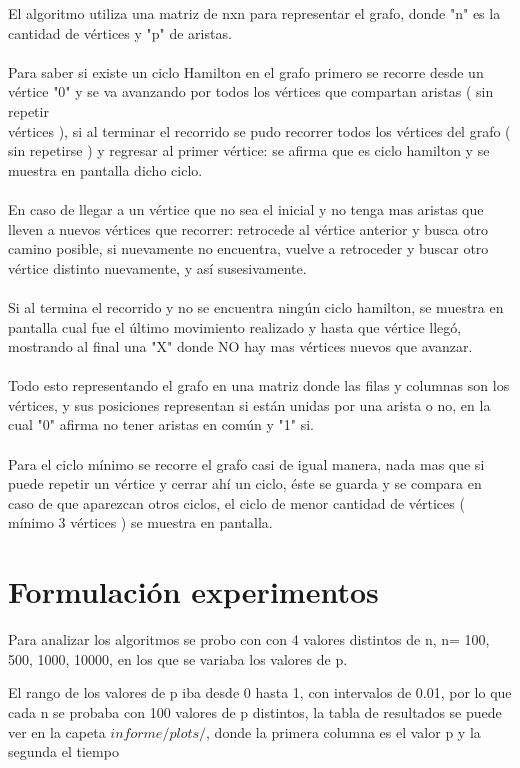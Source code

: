 \documentclass[12pt,letterpaper]{scrartcl}
\begin{document}
El algoritmo utiliza una matriz de nxn para representar el grafo, donde "n" es la cantidad de vértices y "p" de aristas.
\\\\
Para saber si existe un ciclo Hamilton en el grafo primero se recorre desde un vértice "0" y se va avanzando por todos los vértices que compartan aristas ( sin repetir \\vértices ), si al terminar el recorrido se pudo recorrer todos los vértices del grafo ( sin repetirse ) y regresar al primer vértice: se afirma que es ciclo hamilton y se muestra en pantalla dicho ciclo. 
\\\\
En caso de llegar a un vértice que no sea el inicial y no tenga mas aristas que lleven a nuevos vértices  que recorrer: retrocede al vértice anterior y busca otro camino posible, si nuevamente no encuentra, vuelve a retroceder y buscar otro vértice distinto nuevamente, y así susesivamente.
\\\\
Si al termina el recorrido y no se encuentra ningún ciclo hamilton, se muestra en pantalla cual fue el último movimiento realizado y hasta que vértice llegó, mostrando al final una "X" donde NO hay mas vértices nuevos que avanzar.
\\\\
Todo esto representando el grafo en una matriz donde las filas y columnas son los vértices, y sus posiciones representan si están unidas por una arista o no, en la cual "0" afirma no tener aristas en común y "1" si.
\\\\
Para el ciclo mínimo se recorre el grafo casi de igual manera, nada mas que si puede repetir un vértice y cerrar ahí un ciclo, éste se guarda y se compara en caso de que aparezcan otros ciclos, el ciclo de menor cantidad de vértices ( mínimo 3 vértices ) se muestra en pantalla. 

\newpage

\section{Formulación experimentos}

Para analizar los algoritmos se probo con con 4 valores distintos de n, n= 100, 500, 1000, 10000, en los que se variaba los valores de p.

El rango de los valores de p iba desde 0 hasta 1, con intervalos de 0.01, por lo que cada n se probaba con 100 valores de p distintos, la tabla de resultados se puede ver en la capeta $informe/plots/$, donde la primera columna es el valor p y la segunda el tiempo
\end{document}
